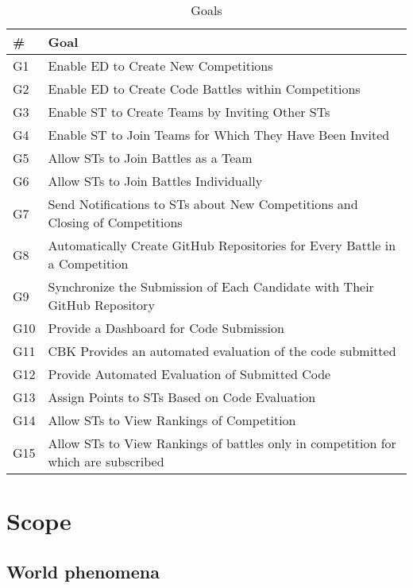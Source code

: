\begin{table}[H]
  \begin{tabular}{|l|l|}
    \hline
    \textbf{\#} & \textbf{Goal}      \\
    \hline
    G1 & Enable ED to Create New Competitions \\
    \hline
    G2 & Enable ED to Create Code Battles within Competitions \\
    \hline
    G3 & Enable ST to Create Teams by Inviting Other STs \\
    \hline
    G4 & Enable ST to Join Teams for Which They Have Been Invited    \\
    \hline
    G5 & Allow STs to Join Battles as a Team    \\
    \hline
    G6 & Allow STs to Join Battles Individually    \\
    \hline
    G7 & Send Notifications to STs about New Competitions and Closing of Competitions    \\
    \hline
    G8 & Automatically Create GitHub Repositories for Every Battle in a Competition    \\
    \hline
    G9 & Synchronize the Submission of Each Candidate with Their GitHub Repository    \\
    \hline
    G10 & Provide a Dashboard for Code Submission    \\
    \hline
    G11 & CBK Provides an automated evaluation of the code submitted  \\
    \hline
    G12 & Provide Automated Evaluation of Submitted Code  \\
    \hline
    G13 & Assign Points to STs Based on Code Evaluation \\
    \hline
    G14 & Allow STs to View Rankings of Competition \\
    \hline
    G15 & Allow STs to View Rankings of  battles only in competition for which are subscribed \\
    \hline
  \end{tabular}
  \caption{Goals}
  \label{tab:simple}
\end{table}

\section{Scope}
\label{s:Scope}%


\subsection{World phenomena}
\label{ss:world_phenomena}%

